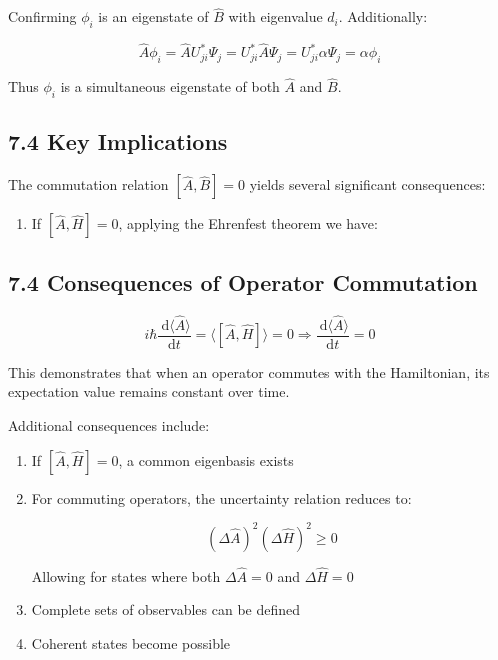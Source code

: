 \documentclass[10pt]{article}
\begin{document}
Confirming $\phi_{i}$ is an eigenstate of $\hat{B}$ with eigenvalue $d_i$. Additionally:

\begin{equation*}
\hat{A} \phi_{i}=\hat{A} U_{j i}^{*} \Psi_{j}=U_{j i}^{*} \hat{A} \Psi_{j}=U_{j i}^{*} \alpha \Psi_{j}=\alpha \phi_{i} \tag{7.35}
\end{equation*}

Thus $\phi_{i}$ is a simultaneous eigenstate of both $\hat{A}$ and $\hat{B}$.

\subsection*{7.4 Key Implications}
The commutation relation $[\hat{A}, \hat{B}]=0$ yields several significant consequences:

\begin{enumerate}
  \item If $[\hat{A}, \hat{H}]=0$, applying the Ehrenfest theorem we have:
\end{enumerate}


\subsection*{7.4 Consequences of Operator Commutation}

\begin{equation*}
i \hbar \frac{\mathrm{~d}\langle\hat{A}\rangle}{\mathrm{d} t}=\langle[\hat{A}, \hat{H}]\rangle=0 \Longrightarrow \frac{\mathrm{~d}\langle\hat{A}\rangle}{\mathrm{d} t}=0 \tag{7.36}
\end{equation*}

This demonstrates that when an operator commutes with the Hamiltonian, its expectation value remains constant over time.

Additional consequences include:
\begin{enumerate}
  \item If $[\hat{A}, \hat{H}]=0$, a common eigenbasis exists
  \item For commuting operators, the uncertainty relation reduces to:

\begin{equation*}
(\Delta \hat{A})^{2}(\Delta \hat{H})^{2} \geq 0 \tag{7.37}
\end{equation*}

  Allowing for states where both $\Delta \hat{A}=0$ and $\Delta \hat{H}=0$
  \item Complete sets of observables can be defined
  \item Coherent states become possible
\end{enumerate}
\end{document}
